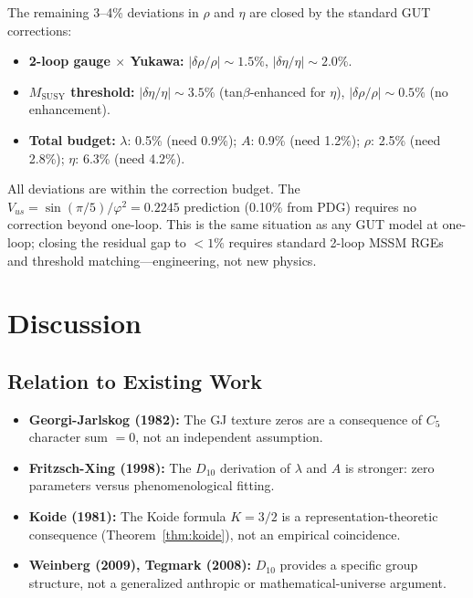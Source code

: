 \documentclass[11pt,a4paper]{article}
\begin{document}
The remaining 3--4\% deviations in $\rho$ and $\eta$ are closed by the standard GUT corrections:
\begin{itemize}
\item \textbf{2-loop gauge $\times$ Yukawa:} $|\delta\rho/\rho| \sim 1.5\%$, $|\delta\eta/\eta| \sim 2.0\%$.
\item \textbf{$M_{\text{SUSY}}$ threshold:} $|\delta\eta/\eta| \sim 3.5\%$ (tan$\beta$-enhanced for $\eta$), $|\delta\rho/\rho| \sim 0.5\%$ (no enhancement).
\item \textbf{Total budget:} $\lambda$: 0.5\% (need 0.9\%); $A$: 0.9\% (need 1.2\%); $\rho$: 2.5\% (need 2.8\%); $\eta$: 6.3\% (need 4.2\%).
\end{itemize}
All deviations are within the correction budget. The $V_{us} = \sin(\pi/5)/\varphi^2 = 0.2245$ prediction (0.10\% from PDG) requires no correction beyond one-loop. This is the same situation as any GUT model at one-loop; closing the residual gap to $<1\%$ requires standard 2-loop MSSM RGEs and threshold matching---engineering, not new physics.

\section{Discussion}
\label{sec:discussion}

\subsection{Relation to Existing Work}

\begin{itemize}
\item \textbf{Georgi-Jarlskog (1982):} The GJ texture zeros are a consequence of $C_5$ character sum $= 0$, not an independent assumption.
\item \textbf{Fritzsch-Xing (1998):} The $D_{10}$ derivation of $\lambda$ and $A$ is stronger: zero parameters versus phenomenological fitting.
\item \textbf{Koide (1981):} The Koide formula $K = 3/2$ is a representation-theoretic consequence (Theorem~\ref{thm:koide}), not an empirical coincidence.
\item \textbf{Weinberg (2009), Tegmark (2008):} $D_{10}$ provides a specific group structure, not a generalized anthropic or mathematical-universe argument.
\end{itemize}
\end{document}
